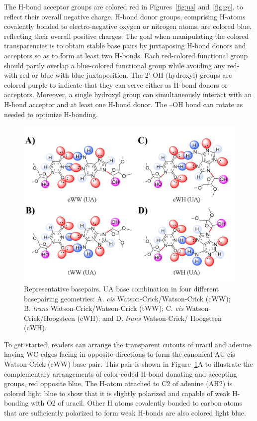 The H-bond acceptor groups are colored red in Figures~\ref{fig:ua}
and~\ref{fig:gc}, to reflect their overall negative charge. H-bond donor groups,
comprising H-atoms covalently bonded to electro-negative oxygen or nitrogen
atoms, are colored blue, reflecting their overall positive charges. The goal
when manipulating the colored transparencies is to obtain stable base pairs by
juxtaposing H-bond donors and acceptors so as to form at least two H-bonds. Each
red-colored functional group should partly overlap a blue-colored functional
group while avoiding any red-with-red or blue-with-blue juxtaposition. The 2’-OH
(hydroxyl) groups are colored purple to indicate that they can serve either as
H-bond donors or acceptors. Moreover, a single hydroxyl group can simultaneously
interact with an H-bond acceptor and at least one H-bond donor. The –OH bond can
rotate as needed to optimize H-bonding.

\begin{figure}
  \includegraphics[width=\linewidth]{chapter-1/figs/basepairs}
  \caption{Representative basepairs. UA base combination in four different
    basepairing geometries: A. \emph{cis} Watson-Crick/Watson-Crick (cWW); B. \emph{trans}
    Watson-Crick/Watson-Crick (tWW); C. \emph{cis} Watson-Crick/Hoogsteen (cWH); and D.
  \emph{trans} Watson-Crick/ Hoogsteen (cWH).}
\label{fig:basepairs}
\end{figure}

To get started, readers can arrange the transparent cutouts of uracil and
adenine having WC edges facing in opposite directions to form the canonical AU
cis Watson-Crick (cWW) base pair. This pair is shown in Figure~\ref{fig:basepairs}A to illustrate
the complementary arrangements of color-coded H-bond donating and accepting
groups, red opposite blue. The H-atom attached to C2 of adenine (AH2) is colored
light blue to show that it is slightly polarized and capable of weak H-bonding
with O2 of uracil. Other H atoms covalently bonded to carbon atoms that are
sufficiently polarized to form weak H-bonds are also colored light blue. 

